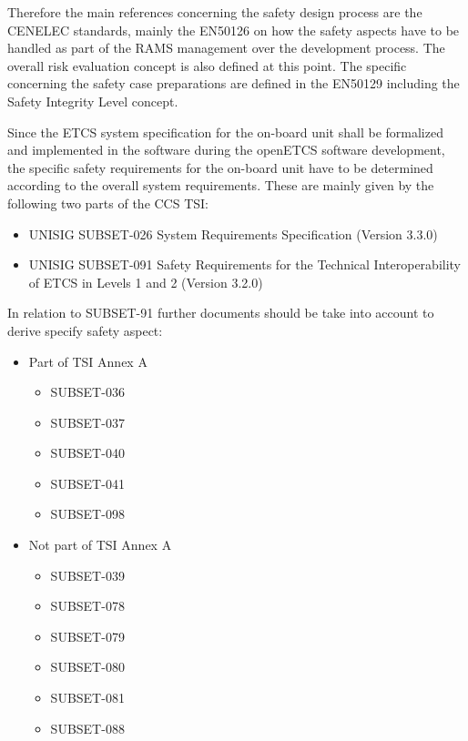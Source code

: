 \documentclass{template/openetcs_report}
\begin{document}
Therefore the main references concerning the safety design process are the CENELEC standards, mainly the EN50126 on how the safety aspects have to be handled as part of the RAMS management over the development process. The overall risk evaluation concept is also defined at this point. The specific concerning the safety case preparations are defined in the EN50129 including the Safety Integrity Level concept. 

Since the ETCS system specification for the on-board unit shall be formalized and implemented in the software during the openETCS software development, the specific safety requirements for the on-board unit have to be determined according to the overall system requirements. These are mainly given by the following two parts of the CCS TSI:

\begin{itemize}
\item UNISIG SUBSET-026	System Requirements Specification 	(Version 3.3.0)
\item UNISIG SUBSET-091 Safety Requirements for the Technical Interoperability of ETCS in Levels 1 and 2 	(Version 3.2.0)
\end{itemize}

In relation to SUBSET-91 further documents should be take into account to derive specify safety aspect:

\begin{itemize}
\item Part of TSI Annex A
	\begin{itemize}
	\item SUBSET-036
	\item SUBSET-037
	\item SUBSET-040
	\item SUBSET-041
	\item SUBSET-098
	\end{itemize}
	
\item Not part of TSI Annex A
	\begin{itemize}
	\item SUBSET-039
	\item SUBSET-078
	\item SUBSET-079
	\item SUBSET-080
	\item SUBSET-081
	\item SUBSET-088
	\end{itemize}
\end{itemize}
\end{document}
